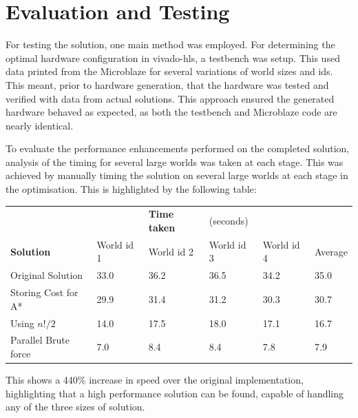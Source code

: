 \documentclass[a4paper, 11pt]{article}
\begin{document}
\section{Evaluation and Testing} %
For testing the solution, one main method was employed. For
determining the optimal hardware configuration in vivado-hls, a testbench was setup. This
used data printed from the Microblaze for several variations of world sizes and 
ids. This meant, prior to hardware generation, that the hardware was tested and 
verified with data from actual solutions. This approach ensured the generated hardware 
behaved as expected, as both the testbench and Microblaze code are nearly identical. 
\par\bigskip\noindent
To evaluate the performance enhancements performed on the completed solution,
analysis of the timing for several large worlds was taken at each stage. This
was achieved by manually timing the solution on several large worlds at each
stage in the optimisation. This is highlighted by the following table: 
\begin{table}[!htbp]
\centering
\begin{tabular}{l|lllll}
                  &  &  \textbf{Time taken} & (seconds)          & \\ 
    \textbf{Solution} & World id 1          & World id 2 & World id 3 & World id 4 & Average\\ \hline
    Original Solution    & 33.0             & 36.2       & 36.5   & 34.2 & 35.0 \\ 
    Storing Cost for A*  & 29.9             & 31.4       & 31.2   & 30.3 & 30.7 \\ 
    Using $n!/2$         & 14.0             & 17.5       & 18.0   & 17.1 & 16.7 \\ 
    Parallel Brute force & 7.0              & 8.4        & 8.4    & 7.8  & 7.9 
\end{tabular}
\end{table}
\FloatBarrier\noindent
This shows a 440\% increase in speed over the original implementation, highlighting 
that a high performance solution can be found, capable of handling any of the three
sizes of solution. 


\end{document}
